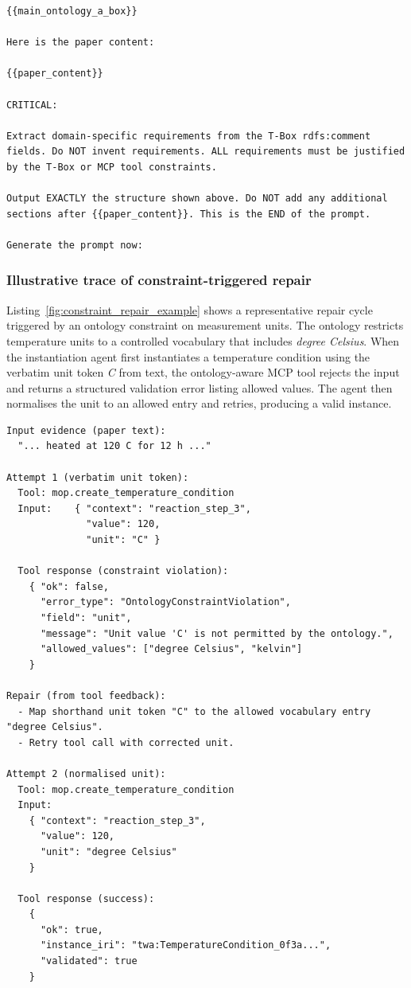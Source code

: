 \begin{lstlisting}
{{main_ontology_a_box}}

Here is the paper content:

{{paper_content}}

CRITICAL:

Extract domain-specific requirements from the T-Box rdfs:comment fields. Do NOT invent requirements. ALL requirements must be justified by the T-Box or MCP tool constraints.

Output EXACTLY the structure shown above. Do NOT add any additional sections after {{paper_content}}. This is the END of the prompt.

Generate the prompt now:
\end{lstlisting}\label{lst:extension_user_prompt}

\clearpage
\subsubsection{Illustrative trace of constraint-triggered repair}

Listing~\ref{fig:constraint_repair_example} shows a representative repair cycle
triggered by an ontology constraint on measurement units. The ontology
restricts temperature units to a controlled vocabulary that includes
\emph{degree Celsius}. When the instantiation agent first instantiates a
temperature condition using the verbatim unit token \emph{C} from text, the
ontology-aware MCP tool rejects the input and returns a structured validation
error listing allowed values. The agent then normalises the unit to an allowed
entry and retries, producing a valid instance.

\begin{lstlisting}[caption={Representative MCP trace: ontology-constrained unit repair (C $\rightarrow$ degree Celsius).},label={fig:constraint_repair_example}]
Input evidence (paper text):
  "... heated at 120 C for 12 h ..."

Attempt 1 (verbatim unit token):
  Tool: mop.create_temperature_condition
  Input:    { "context": "reaction_step_3",
              "value": 120,
              "unit": "C" }

  Tool response (constraint violation):
    { "ok": false,
      "error_type": "OntologyConstraintViolation",
      "field": "unit",
      "message": "Unit value 'C' is not permitted by the ontology.",
      "allowed_values": ["degree Celsius", "kelvin"]
    }

Repair (from tool feedback):
  - Map shorthand unit token "C" to the allowed vocabulary entry "degree Celsius".
  - Retry tool call with corrected unit.

Attempt 2 (normalised unit):
  Tool: mop.create_temperature_condition
  Input:
    { "context": "reaction_step_3",
      "value": 120,
      "unit": "degree Celsius"
    }

  Tool response (success):
    {
      "ok": true,
      "instance_iri": "twa:TemperatureCondition_0f3a...",
      "validated": true
    }
\end{lstlisting}
 

